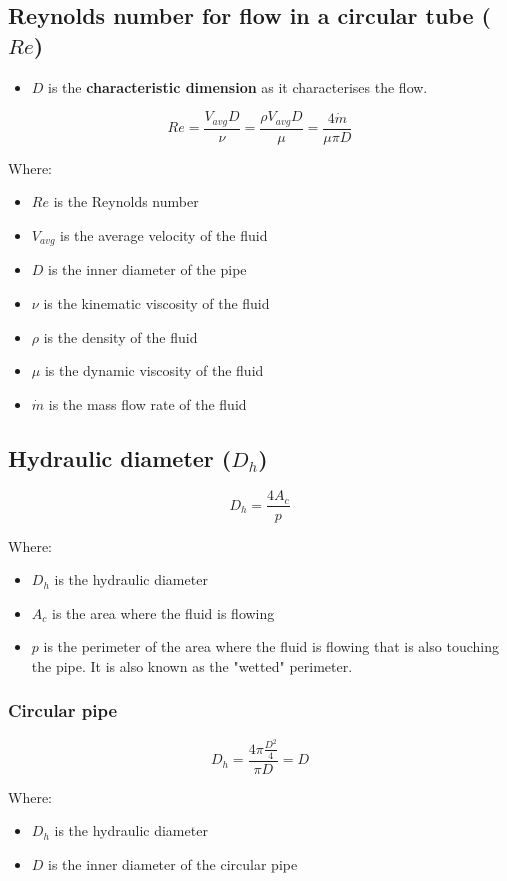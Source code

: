 \documentclass[11pt]{article}
\begin{document}
 \newpage

\subsection{Reynolds number for flow in a circular tube (\(Re\))}
\label{sec:org76742ff}
\begin{itemize}
\item \(D\) is the \textbf{characteristic dimension} as it characterises the flow.
\end{itemize}
\[Re = \frac{V_{avg} D}{\nu} = \frac{\rho V_{avg} D}{\mu} = \frac{4 \dot{m}}{\mu \pi D}\]

Where:
\begin{itemize}
\item \(Re\) is the Reynolds number
\item \(V_{avg}\) is the average velocity of the fluid
\item \(D\) is the inner diameter of the pipe
\item \(\nu\) is the kinematic viscosity of the fluid
\item \(\rho\) is the density of the fluid
\item \(\mu\) is the dynamic viscosity of the fluid
\item \(\dot{m}\) is the mass flow rate of the fluid
\end{itemize}

\subsection{Hydraulic diameter (\(D_h\))}
\label{sec:orgff17b9e}
\[D_h = \frac{4 A_c}{p}\]

Where:
\begin{itemize}
\item \(D_h\) is the hydraulic diameter
\item \(A_c\) is the area where the fluid is flowing
\item \(p\) is the perimeter of the area where the fluid is flowing that is also touching the pipe. It is also known as the "wetted" perimeter.
\end{itemize}

\subsubsection{Circular pipe}
\label{sec:orge95e670}
\[D_h = \frac{4 \pi \frac{D^2}{4}}{\pi D} = D\]

Where:
\begin{itemize}
\item \(D_h\) is the hydraulic diameter
\item \(D\) is the inner diameter of the circular pipe
\end{itemize}
\end{document}
